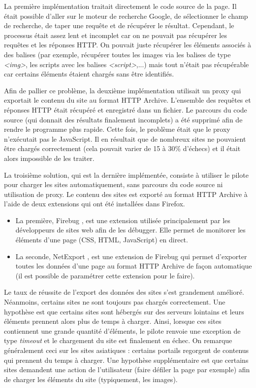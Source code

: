 La première implémentation traitait directement le code source de la page. Il était possible d'aller sur le moteur de recherche Google, de sélectionner le champ de recherche, de taper une requête et de récupérer le résultat. Cependant, le processus était assez lent et incomplet car on ne pouvait pas récupérer les requêtes et les réponses HTTP. On pouvait juste récupérer les éléments associés à des balises (par exemple, récupérer toutes les images via les balises de type \textit{<img>}, les scripts avec les balises \textit{<script>},...) mais tout n'était pas récupérable car certains éléments étaient chargés sans être identifiés.

Afin de pallier ce problème, la deuxième implémentation utilisait un proxy qui exportait le contenu du site au format HTTP Archive. L'ensemble des requêtes et réponses HTTP était récupéré et enregistré dans un fichier. Le parcours du code source (qui donnait des résultats finalement incomplets) a été supprimé afin de rendre le programme plus rapide. Cette fois, le problème était que le proxy n'exécutait pas le JavaScript. Il en résultait que de nombreux sites ne pouvaient être chargés correctement (cela pouvait varier de 15 à 30\% d'échecs) et il était alors impossible de les traiter.

La troisième solution, qui est la dernière implémentée, consiste à utiliser le pilote pour charger les sites automatiquement, sans parcours du code source ni utilisation de proxy. Le contenu des sites est exporté au format HTTP Archive à l'aide de deux extensions qui ont été installées dans Firefox.
\begin{itemize}
	\item La première, Firebug \cite{firebug_homepage}, est une extension utilisée principalement par les développeurs de sites web afin de les débugger. Elle permet de monitorer les éléments d'une page (CSS, HTML, JavaScript) en direct.
	\item La seconde, NetExport \cite{netexport_homepage}, est une extension de Firebug qui permet d'exporter toutes les données d'une page au format HTTP Archive de façon automatique (il est possible de paramétrer cette extension pour le faire).
\end{itemize}

Le taux de réussite de l'export des données des sites s'est grandement amélioré. Néanmoins, certains sites ne sont toujours pas chargés correctement.
Une hypothèse est que certains sites sont hébergés sur des serveurs lointains et leurs éléments prennent alors plus de temps à charger. Ainsi, lorsque ces sites contiennent une grande quantité d'éléments, le pilote renvoie une exception de type \textit{timeout} et le chargement du site est finalement en échec. On remarque généralement ceci sur les sites asiatiques : certains portails regorgent de contenus qui prennent du temps à charger.
Une hypothèse supplémentaire est que certains sites demandent une action de l'utilisateur (faire défiler la page par exemple) afin de charger les éléments du site (typiquement, les images).
\newline

